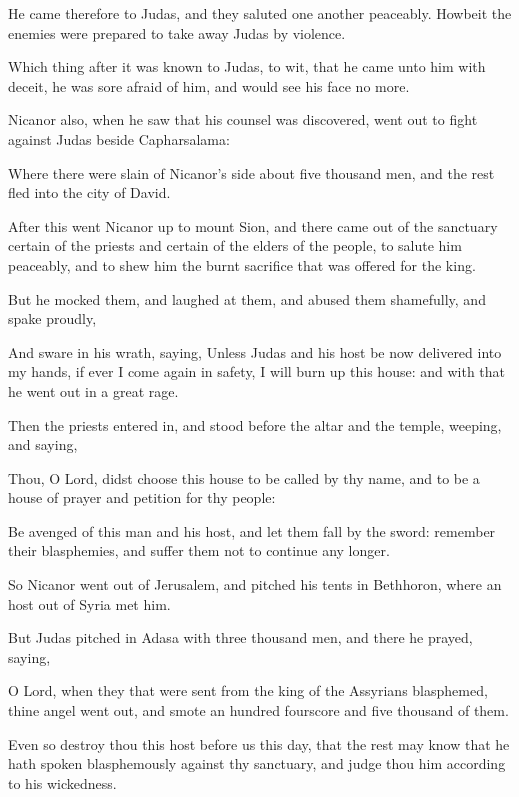 {\par }{\PP {}He came therefore to Judas, and they saluted one another peaceably. Howbeit the enemies were prepared to take away Judas by violence.
\par }{\PP {}Which thing after it was known to Judas, to wit, that he came unto him with deceit, he was sore afraid of him, and would see his face no more.
\par }{\PP {}Nicanor also, when he saw that his counsel was discovered, went out to fight against Judas beside Capharsalama:
\par }{\PP {}Where there were slain of Nicanor’s side about five thousand men, and the rest fled into the city of David.
\par }{\PP {}After this went Nicanor up to mount Sion, and there came out of the sanctuary certain of the priests and certain of the elders of the people, to salute him peaceably, and to shew him the burnt sacrifice that was offered for the king.
\par }{\PP {}But he mocked them, and laughed at them, and abused them shamefully, and spake proudly,
\par }{\PP {}And sware in his wrath, saying, Unless Judas and his host be now delivered into my hands, if ever I come again in safety, I will burn up this house: and with that he went out in a great rage.
\par }{\PP {}Then the priests entered in, and stood before the altar and the temple, weeping, and saying,
\par }{\PP {}Thou, O Lord, didst choose this house to be called by thy name, and to be a house of prayer and petition for thy people:
\par }{\PP {}Be avenged of this man and his host, and let them fall by the sword: remember their blasphemies, and suffer them not to continue any longer.
\par }{\PP {}So Nicanor went out of Jerusalem, and pitched his tents in Bethhoron, where an host out of Syria met him.
\par }{\PP {}But Judas pitched in Adasa with three thousand men, and there he prayed, saying,
\par }{\PP {}O Lord, when they that were sent from the king of the Assyrians blasphemed, thine angel went out, and smote an hundred fourscore and five thousand of them.
\par }{\PP {}Even so destroy thou this host before us this day, that the rest may know that he hath spoken blasphemously against thy sanctuary, and judge thou him according to his wickedness.
}
